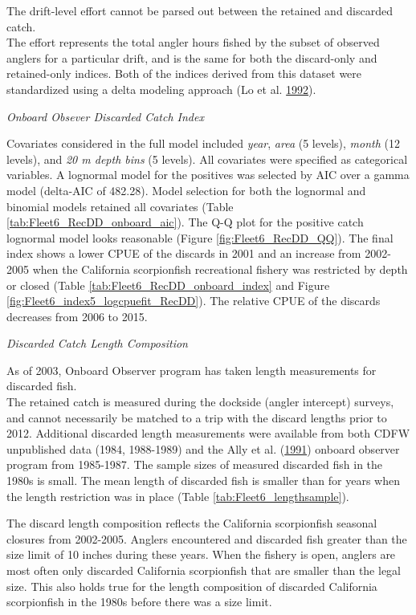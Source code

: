 \documentclass[12pt,]{article}
\begin{document}
The drift-level effort cannot be parsed out between the retained and
discarded catch.\\
The effort represents the total angler hours fished by the subset of
observed anglers for a particular drift, and is the same for both the
discard-only and retained-only indices. Both of the indices derived from
this dataset were standardized using a delta modeling approach (Lo et
al. \protect\hyperlink{ref-Lo1992}{1992}).

\emph{Onboard Obsever Discarded Catch Index}

Covariates considered in the full model included \emph{year},
\emph{area} (5 levels), \emph{month} (12 levels), and \emph{20 m depth
bins} (5 levels). All covariates were specified as categorical
variables. A lognormal model for the positives was selected by AIC over
a gamma model (delta-AIC of 482.28). Model selection for both the
lognormal and binomial models retained all covariates (Table
\ref{tab:Fleet6_RecDD_onboard_aic}). The Q-Q plot for the positive catch
lognormal model looks reasonable (Figure \ref{fig:Fleet6_RecDD_QQ}). The
final index shows a lower CPUE of the discards in 2001 and an increase
from 2002-2005 when the California scorpionfish recreational fishery was
restricted by depth or closed (Table
\ref{tab:Fleet6_RecDD_onboard_index} and Figure
\ref{fig:Fleet6_index5_logcpuefit_RecDD}). The relative CPUE of the
discards decreases from 2006 to 2015.

\emph{Discarded Catch Length Composition}

As of 2003, Onboard Observer program has taken length measurements for
discarded fish.\\
The retained catch is measured during the dockside (angler intercept)
surveys, and cannot necessarily be matched to a trip with the discard
lengths prior to 2012. Additional discarded length measurements were
available from both CDFW unpublished data (1984, 1988-1989) and the Ally
et al. (\protect\hyperlink{ref-Ally1991}{1991}) onboard observer program
from 1985-1987. The sample sizes of measured discarded fish in the 1980s
is small. The mean length of discarded fish is smaller than for years
when the length restriction was in place (Table
\ref{tab:Fleet6_lengthsample}).

The discard length composition reflects the California scorpionfish
seasonal closures from 2002-2005. Anglers encountered and discarded fish
greater than the size limit of 10 inches during these years. When the
fishery is open, anglers are most often only discarded California
scorpionfish that are smaller than the legal size. This also holds true
for the length composition of discarded California scorpionfish in the
1980s before there was a size limit.
\end{document}
